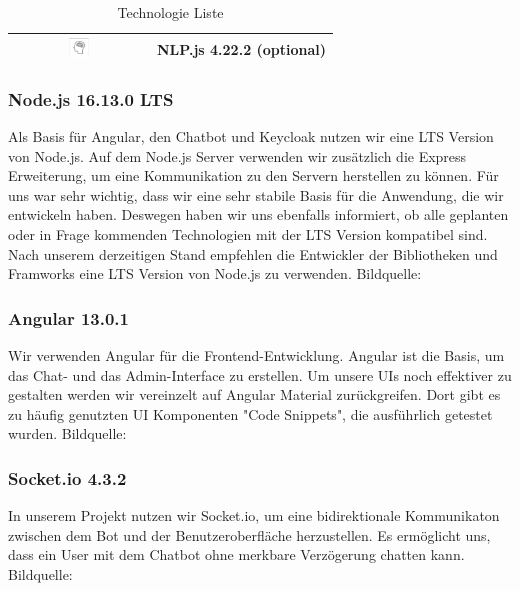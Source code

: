 \begin{table}[H]
\begin{center}
\begin{tabular}{|c|c|}
            \hline
            \includegraphics[width=0.15\textwidth]{bilder/technologien/NLP.png}       &
            \multirow[c]{1}[1]{*}[30pt]{NLP.js 4.22.2 (optional)}                       \\
            \hline
        \end{tabular}
        \caption{Technologie Liste}
        \label{tab:Technologie Liste}
    \end{center}
\end{table}


\subsubsection{Node.js 16.13.0 LTS}
Als Basis für Angular, den Chatbot und Keycloak nutzen wir eine LTS Version von Node.js.
Auf dem Node.js Server verwenden wir zusätzlich die Express Erweiterung,
um eine Kommunikation zu den Servern herstellen zu können.
Für uns war sehr wichtig, dass wir eine sehr stabile Basis für die Anwendung,
die wir entwickeln haben.
Deswegen haben wir uns ebenfalls informiert, ob alle geplanten oder in Frage kommenden Technologien mit der LTS Version kompatibel sind.
Nach unserem derzeitigen Stand empfehlen die Entwickler der Bibliotheken und Framworks eine LTS Version von Node.js zu verwenden.
Bildquelle:\cite{nodejsicon}


\subsubsection{Angular 13.0.1}
Wir verwenden Angular für die Frontend-Entwicklung.
Angular ist die Basis, um das Chat- und das Admin-Interface zu erstellen.
Um unsere UIs noch effektiver zu gestalten werden wir vereinzelt auf Angular Material zurückgreifen.
Dort gibt es zu häufig genutzten UI Komponenten "Code Snippets", die ausführlich getestet wurden.
Bildquelle:\cite{angularicon}

\subsubsection{Socket.io 4.3.2}
In unserem Projekt nutzen wir Socket.io, um eine bidirektionale Kommunikaton zwischen dem Bot und
der Benutzeroberfläche herzustellen.
Es ermöglicht uns, dass ein User mit dem Chatbot ohne merkbare Verzögerung chatten kann.
Bildquelle:\cite{socketioicon}

